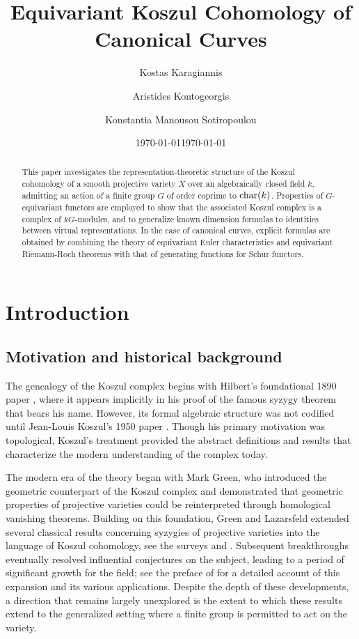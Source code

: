 \documentclass[10pt]{amsart}
\date{\today}
\title{Equivariant Koszul Cohomology of Canonical Curves}
\author[K. Karagiannis]{Kostas Karagiannis}
\author[A. Kontogeorgis]{Aristides Kontogeorgis}
\author[K. Manousou Sotiropoulou]{Konstantia Manousou Sotiropoulou}
\date \today
\theoremstyle{definition}
\begin{document}
\begin{abstract}
This paper investigates the representation-theoretic structure of the Koszul cohomology of a smooth projective variety $X$ over an algebraically closed field $k$, admitting an action of a finite group $G$ of order coprime to ${\rm char}(k)$. Properties of $G$-equivariant functors are employed to show that the associated Koszul complex is a complex of $kG$-modules, and to generalize known dimension formulas to identities between virtual representations. In the case of canonical curves, explicit formulas are obtained by combining the theory of equivariant Euler characteristics and equivariant Riemann-Roch theorems with that of generating functions for Schur functors.
\end{abstract}



\maketitle


%
%
%
\section{Introduction}

\subsection{Motivation and historical background}
The genealogy of the Koszul complex begins with Hilbert’s foundational 1890 paper \cite{MR1510634}, where it appears implicitly in his proof of the famous syzygy theorem that bears his name. However, its formal algebraic structure was not codified until Jean-Louis Koszul’s 1950 paper \cite{MR42428}. Though his primary motivation was topological, Koszul’s treatment provided the abstract definitions and results that characterize the modern understanding of the complex today.

The modern era of the theory began with Mark Green, who introduced the geometric counterpart of the Koszul complex \cite{MR739785} and demonstrated that geometric properties of projective varieties could be reinterpreted through homological vanishing theorems. Building on this foundation, Green and Lazarsfeld extended several classical results concerning syzygies of projective varieties into the language of Koszul cohomology, see the surveys \cite{MR1082354} and \cite{MR1082360}. Subsequent breakthroughs eventually resolved influential conjectures on the subject, leading to a period of significant growth for the field; see the preface of \cite{MR2573635} for a detailed account of this expansion and its various applications. Despite the depth of these developments, a direction that remains largely unexplored is the extent to which these results extend to the generalized setting where a finite group is permitted to act on the variety.
\end{document}
